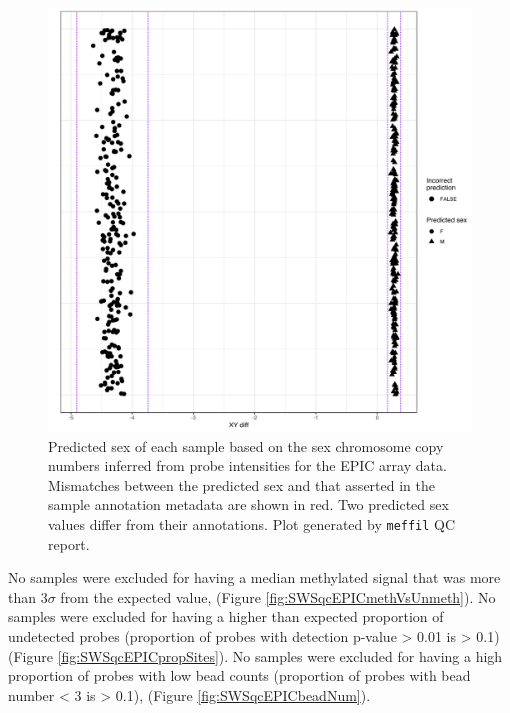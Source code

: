 \documentclass[
]{book}
\begin{document}
\begin{figure}

{\centering \includegraphics[width=0.8\linewidth]{figs/SWSqcEPICsexMismatch} 

}

\caption{Predicted sex of each sample based on the sex chromosome copy numbers inferred from probe intensities for the EPIC array data. Mismatches between the predicted sex and that asserted in the sample annotation metadata are shown in red. Two predicted sex values differ from their annotations. Plot generated by \texttt{meffil} QC report.}\label{fig:SWSqcEPICsexMismatch}
\end{figure}



No samples were excluded for having a median methylated signal that was more than \(3\sigma\) from the expected value, (Figure \ref{fig:SWSqcEPICmethVsUnmeth}).
No samples were excluded for having a higher than expected proportion of undetected probes (proportion of probes with detection p-value \textgreater{} 0.01 is \textgreater{} 0.1) (Figure \ref{fig:SWSqcEPICpropSites}).
No samples were excluded for having a high proportion of probes with low bead counts (proportion of probes with bead number \textless{} 3 is \textgreater{} 0.1), (Figure \ref{fig:SWSqcEPICbeadNum}).
\end{document}
